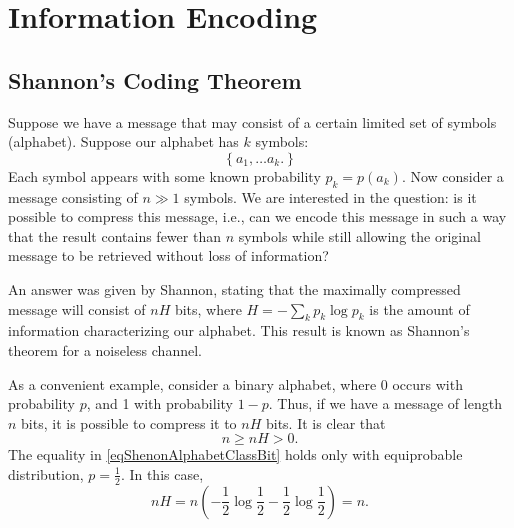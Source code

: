 \section{Information Encoding}

\subsection{Shannon's Coding Theorem}
Suppose we have a message that may consist of a certain limited set of symbols (alphabet). Suppose our alphabet has $k$ symbols:
\begin{equation}
\left\{
a_1, \dots a_k.
\right\}
\label{eqShenonAlphabetClass}
\end{equation}
Each symbol appears with some known probability $p_k = p\left(a_k\right)$. Now consider a message consisting of $n \gg 1$ symbols. We are interested in the question: is it possible to compress this message, i.e., can we encode this message in such a way that the result contains fewer than $n$ symbols while still allowing the original message to be retrieved without loss of information?

An answer was given by Shannon, stating that the maximally compressed message will consist of $n H$ bits, where $H = - \sum_k p_k \log p_k$ is the amount of information characterizing our alphabet. This result is known as Shannon's theorem for a noiseless channel.

As a convenient example, consider a binary alphabet, where 0 occurs with probability $p$, and 1 with probability $1 - p$. Thus, if we have a message of length $n$ bits, it is possible to compress it to $n H$ bits. It is clear that 
\begin{equation}
n \ge n H > 0.
\label{eqShenonAlphabetClassBit}
\end{equation}
The equality in \eqref{eqShenonAlphabetClassBit} holds only with equiprobable distribution, $p = \frac{1}{2}$. In this case,
\[
n H = n \left(- \frac{1}{2} \log \frac{1}{2} - \frac{1}{2} \log \frac{1}{2}\right) = n.
\]

